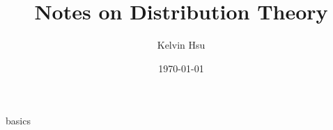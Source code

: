 \documentclass{article}
\title{Notes on Distribution Theory}
\author{Kelvin Hsu}
\date{\today}
\begin{document}
\maketitle
{basics}




\end{document}
